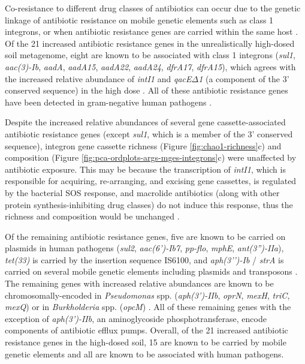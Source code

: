 Co-resistance to different drug classes of antibiotics can occur due to the genetic linkage of antibiotic resistance on mobile genetic elements such as class 1 integrons, or when antibiotic resistance genes are carried within the same host \parencite{Pal.2015}.
Of the 21 increased antibiotic resistance genes in the unrealistically high-dosed soil metagenome, eight are known to be associated with class 1 integrons (\textit{sul1}, \textit{aac(3)-Ib}, \textit{aadA}, \textit{aadA15}, \textit{aadA22}, \textit{aadA24}, \textit{dfrA17}, \textit{dfrA15}), which agrees with the increased relative abundance of \textit{intI1} and \textit{qacE$\Delta$1} (a component of the 3' conserved sequence) in the high dose \parencite{Partridge.2009, Yan.2006, Herrero.2008}.
All of these antibiotic resistance genes have been detected in gram-negative human pathogens \parencite{Alcock.2020}.

Despite the increased relative abundances of several gene cassette-associated antibiotic resistance genes (except \textit{sul1}, which is a member of the 3' conserved sequence), integron gene cassette richness (Figure \ref{fig:chao1-richness}c) and composition (Figure \ref{fig:pca-ordplots-args-mges-integrons}c) were unaffected by antibiotic exposure.
This may be because the transcription of \textit{intI1}, which is responsible for acquiring, re-arranging, and excising gene cassettes, is regulated by the bacterial SOS response, and macrolide antibiotics (along with other protein synthesis-inhibiting drug classes) do not induce this response, thus the richness and composition would be unchanged \parencite{Baharoglu.2010}.


Of the remaining antibiotic resistance genes, five are known to be carried on plasmids in human pathogens (\textit{sul2}, \textit{aac(6')-Ib7}, \textit{pp-flo}, \textit{mphE}, \textit{ant(3'')-IIa}), \textit{tet(33)} is carried by the insertion sequence IS6100, and \textit{aph(3’’)-Ib} / \textit{strA} is carried on several mobile genetic elements including plasmids and transposons \parencite{Alcock.2020, Tauch.2002}.
The remaining genes with increased relative abundances are known to be chromosomally-encoded in \textit{Pseudomonas} spp. (\textit{aph(3’)-IIb}, \textit{oprN}, \textit{mexH}, \textit{triC}, \textit{mexQ}) or in \textit{Burkholderia} spp. (\textit{opcM}) \parencite{Hachler.1996, Mesaros.2007, Mima.2005, Mima.2007, Burns.1996}.
All of these remaining genes with the exception of \textit{aph(3')-IIb}, an aminoglycoside phosphotransferase, encode components of antibiotic efflux pumps.
Overall, of the 21 increased antibiotic resistance genes in the high-dosed soil, 15 are known to be carried by mobile genetic elements and all are known to be associated with human pathogens.

